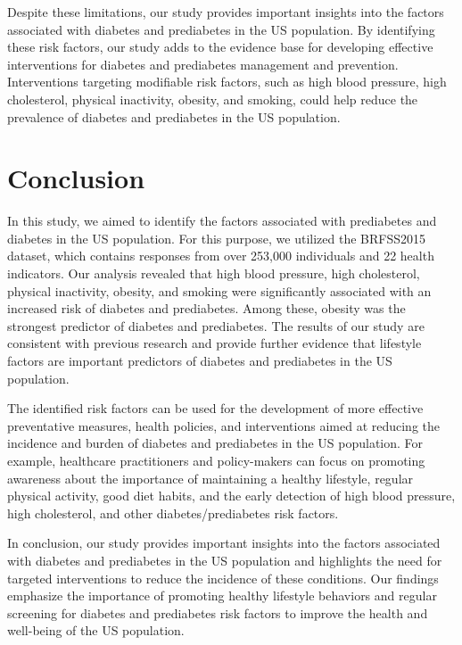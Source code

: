 \documentclass[12pt]{article}
\begin{document}
Despite these limitations, our study provides important insights into the factors associated with diabetes and prediabetes in the US population. By identifying these risk factors, our study adds to the evidence base for developing effective interventions for diabetes and prediabetes management and prevention. Interventions targeting modifiable risk factors, such as high blood pressure, high cholesterol, physical inactivity, obesity, and smoking, could help reduce the prevalence of diabetes and prediabetes in the US population.

\section{Conclusion}

In this study, we aimed to identify the factors associated with prediabetes and diabetes in the US population. For this purpose, we utilized the BRFSS2015 dataset, which contains responses from over 253,000 individuals and 22 health indicators. Our analysis revealed that high blood pressure, high cholesterol, physical inactivity, obesity, and smoking were significantly associated with an increased risk of diabetes and prediabetes. Among these, obesity was the strongest predictor of diabetes and prediabetes. The results of our study are consistent with previous research and provide further evidence that lifestyle factors are important predictors of diabetes and prediabetes in the US population.

The identified risk factors can be used for the development of more effective preventative measures, health policies, and interventions aimed at reducing the incidence and burden of diabetes and prediabetes in the US population. For example, healthcare practitioners and policy-makers can focus on promoting awareness about the importance of maintaining a healthy lifestyle, regular physical activity, good diet habits, and the early detection of high blood pressure, high cholesterol, and other diabetes/prediabetes risk factors. 

In conclusion, our study provides important insights into the factors associated with diabetes and prediabetes in the US population and highlights the need for targeted interventions to reduce the incidence of these conditions. Our findings emphasize the importance of promoting healthy lifestyle behaviors and regular screening for diabetes and prediabetes risk factors to improve the health and well-being of the US population.




\end{document}
